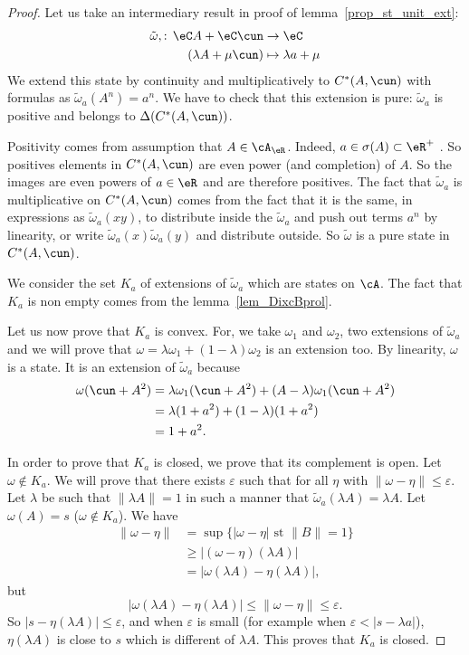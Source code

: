 \begin{proof}
Let us take an intermediary result in proof of lemma~\ref{prop_st_unit_ext}:
\begin{equation}
\begin{aligned}
 \tilde\omega,:\,\eC A+\eC\cun&\to \eC \\
(\lambda A+\mu\cun)&\mapsto \lambda a+\mu
\end{aligned}
\end{equation}
We extend this state by continuity and multiplicatively to $C^*(A,\cun)$ with formulas as $\tilde\omega_a(A^n)=a^n$. We have to check that this extension is pure: $\tilde\omega_a$ is positive and belongs to $\Delta(C^*(A,\cun))$.

Positivity comes from assumption that $A\in\cA_{\eR}$. Indeed, $a\in\sigma(A)\subset\eR^+$ . So positives elements in $C^*(A,\cun)$ are even power (and completion) of $A$. So the images are even powers of  $a\in\eR$ and are therefore positives.
The fact that $\tilde\omega_a$ is multiplicative on $C^*(A,\cun)$ comes from the fact that it is the same, in expressions as
$\tilde\omega_a(xy)$, to distribute inside the $\tilde\omega_a$ and push out terms $a^n$ by linearity, or write $\tilde\omega_a(x)\tilde\omega_a(y)$ and distribute outside. So $\tilde\omega$ is a pure state in $C^*(A,\cun)$.

 We consider the set $K_a$ of extensions of $\tilde\omega_a$ which are states on $\cA$. The fact that $K_a$ is non empty comes from the lemma~\ref{lem_DixcBprol}.

Let us now prove that $K_a$ is convex. For, we take $\omega_1$ and $\omega_2$, two extensions of $\tilde\omega_a$ and we will prove that $\omega=\lambda\omega_1+(1-\lambda)\omega_2$ is an extension too. By linearity, $\omega$ is a state. It is an extension of $\tilde\omega_a$ because
\[
\begin{split}
\omega(\cun+A^2)&=\lambda\omega_1(\cun+A^2)+(A-\lambda)\omega_1(\cun+A^2)\\
        &=\lambda(1+a^2)+(1-\lambda)(1+a^2)\\
        &=1+a^2.
\end{split}
\]

 In order to prove that $K_a$ is closed, we prove that its complement is open. Let $\omega\notin K_a$. We will prove that there exists $\varepsilon$ such that for all $\eta$ with $\| \omega-\eta \|\leq\varepsilon$. Let $\lambda$ be such that $\| \lambda A \|=1$ in such a manner that $\tilde\omega_a(\lambda A)=\lambda A$. Let $\omega(A)=s$ ($\omega\notin K_a$). We have
\[
\begin{split}
\| \omega-\eta \|&=\sup\{ | \omega-\eta |\text{ st } \| B \|=1 \}\\
        &\geq | (\omega-\eta)(\lambda A) |\\
        &=| \omega(\lambda A)-\eta(\lambda A) |,
\end{split}
\]
but
\[
  | \omega(\lambda A)-\eta(\lambda A) |\leq \| \omega-\eta \|\leq\varepsilon.
\]
So $| s-\eta(\lambda A) |\leq \varepsilon$, and when $\varepsilon$ is small (for example when $\varepsilon<| s-\lambda a |$), $\eta(\lambda A)$ is close to $s$ which is different of $\lambda A$. This proves that $K_a$ is closed.


\end{proof}
